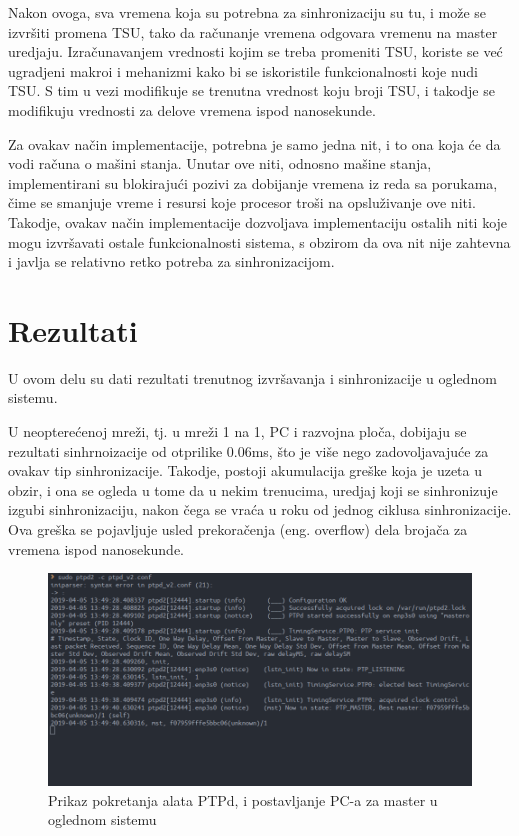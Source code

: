 \documentclass[a4paper,12pt, master]{etf}
\begin{document}
	Nakon ovoga, sva vremena koja su potrebna za sinhronizaciju su tu, i
	mo\v{z}e se izvr\v{s}iti promena TSU, tako da ra\v{c}unanje vremena
	odgovara vremenu na master uredjaju. Izra\v{c}unavanjem vrednosti kojim se
	treba promeniti TSU, koriste se ve\'{c} ugradjeni makroi i mehanizmi kako
	bi se iskoristile funkcionalnosti koje nudi TSU\@. S tim u vezi modifikuje
	se trenutna vrednost koju broji TSU, i takodje se modifikuju vrednosti za
	delove vremena ispod nanosekunde.

	Za ovakav na\v{c}in implementacije, potrebna je samo jedna nit, i to ona
	koja \'{c}e da vodi ra\v{c}una o ma\v{s}ini stanja. Unutar ove niti,
	odnosno ma\v{s}ine stanja, implementirani su blokiraju\'{c}i pozivi za
	dobijanje vremena iz reda sa porukama, \v{c}ime se smanjuje vreme i resursi
	koje procesor tro\v{s}i na opslu\v{z}ivanje ove niti. Takodje, ovakav
	na\v{c}in implementacije dozvoljava implementaciju ostalih niti koje mogu
	izvr\v{s}avati ostale funkcionalnosti sistema, s obzirom da ova nit nije
	zahtevna i javlja se relativno retko potreba za sinhronizacijom.

	\section{Rezultati}

	U ovom delu su dati rezultati trenutnog izvr\v{s}avanja i sinhronizacije u
    oglednom sistemu.

	U neoptere\'{c}enoj mre\v{z}i, tj\@. u mre\v{z}i 1 na 1, PC i razvojna
	plo\v{c}a, dobijaju se rezultati sinhrnoizacije od otprilike 0.06ms,
	\v{s}to je vi\v{s}e nego zadovoljavaju\'{c}e za ovakav tip sinhronizacije.
	Takodje, postoji akumulacija gre\v{s}ke koja je uzeta u obzir, i ona se
	ogleda u tome da u nekim trenucima, uredjaj koji se	sinhronizuje izgubi
    sinhronizaciju, nakon \v{c}ega se vra\'{c}a u roku od jednog ciklusa
	sinhronizacije. Ova gre\v{s}ka se pojavljuje usled prekora\v{c}enja
	(eng\@. overflow) dela broja\v{c}a za vremena ispod nanosekunde.

	\begin{figure}[htb]
			\centering
			\includegraphics[scale=1.2]{../pic/ptpd_startup.png}
            \caption{Prikaz pokretanja alata PTPd, i postavljanje PC-a za
            master u oglednom sistemu}
			\label{fig:ptpd_startup}
	\end{figure}
\end{document}
